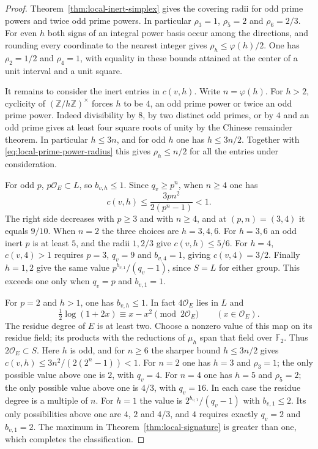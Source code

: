 \documentclass[11pt,letterpaper]{article}
\theoremstyle{definition}
\numberwithin{equation}{section}
\begin{document}
\begin{proof}
Theorem~\ref{thm:local-inert-simplex} gives the covering radii for
odd prime powers and twice odd prime powers. In particular
$\rho_3=1$, $\rho_5=2$ and $\rho_6=2/3$. For even $h$ both signs of
an integral power basis occur among the directions, and rounding every
coordinate to the nearest integer gives $\rho_h\le\varphi(h)/2$.
One has $\rho_2=1/2$ and $\rho_4=1$, with equality in these bounds
attained at the center of a unit interval and a unit square.

It remains to consider the inert entries in $c(v,h)$. Write
$n=\varphi(h)$. For $h>2$, cyclicity of $(\mathbb Z/h\mathbb Z)^\times$
forces $h$ to be $4$, an odd prime power or twice an odd prime power.
Indeed divisibility by $8$, by two distinct odd primes, or by $4$
and an odd prime gives at least four square roots of unity by the
Chinese remainder theorem. In particular $h\le3n$, and for odd
$h$ one has $h\le3n/2$. Together with
\eqref{eq:local-prime-power-radius} this gives $\rho_h\le n/2$
for all the entries under consideration.

For odd $p$, $p\mathcal O_E\subset L$, so $b_{v,h}\le1$.
Since $q_v\ge p^n$, when $n\ge4$ one has
\[
     c(v,h)\le\frac{3p n^2}{2(p^n-1)}<1.
\]
The right side decreases with $p\ge3$ and with $n\ge4$, and at
$(p,n)=(3,4)$ it equals $9/10$. When $n=2$ the three choices are
$h=3,4,6$. For $h=3,6$ an odd inert $p$ is at least $5$, and the
radii $1,2/3$ give $c(v,h)\le5/6$. For $h=4$, $c(v,4)>1$ requires
$p=3$, $q_v=9$ and $b_{v,4}=1$, giving $c(v,4)=3/2$. Finally
$h=1,2$ give the same value $p^{b_{v,1}}/(q_v-1)$, since $S=L$
for either group. This exceeds one only when $q_v=p$ and $b_{v,1}=1$.

For $p=2$ and $h>1$, one has $b_{v,h}\le1$. In fact $4\mathcal O_E$
lies in $L$ and
\[
        \tfrac12\log(1+2x)\equiv x-x^2\pmod {2\mathcal O_E}
                      \qquad (x\in\mathcal O_E).
\]
The residue degree of $E$ is at least two. Choose a nonzero value of
this map on its residue field; its products with the reductions of
$\mu_h$ span that field over $\mathbb F_2$. Thus $2\mathcal O_E\subset S$.
Here $h$ is odd, and for $n\ge6$ the sharper bound $h\le3n/2$ gives
$c(v,h)\le3n^2/(2(2^n-1))<1$. For $n=2$ one has $h=3$ and
$\rho_3=1$; the only possible value above one is $2$, with $q_v=4$.
For $n=4$ one has $h=5$ and $\rho_5=2$; the only possible value
above one is $4/3$, with $q_v=16$. In each case the residue degree
is a multiple of $n$. For $h=1$ the value is $2^{b_{v,1}}/(q_v-1)$
with $b_{v,1}\le2$. Its only possibilities above one are $4$, $2$
and $4/3$, and $4$ requires exactly $q_v=2$ and $b_{v,1}=2$.
The maximum in Theorem~\ref{thm:local-signature} is greater than
one, which completes the classification.
\end{proof}
\end{document}
